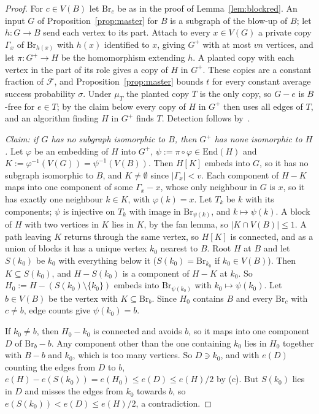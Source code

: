 \documentclass[11pt]{article}
\theoremstyle{remark}
\newcommand{\Fam}{\mathcal{F}}
\newcommand{\abs}[1]{\lvert #1\rvert}
\begin{document}
\begin{proof}
For $c\in V(B)$ let $\mathrm{Br}_c$ be as in the proof of Lemma~\ref{lem:blockred}. An input $G$ of Proposition~\ref{prop:master} for $B$ is a subgraph of the blow-up of $B$; let $h\colon G\to B$ send each vertex to its part. Attach to every $x\in V(G)$ a private copy $\Gamma_x$ of $\mathrm{Br}_{h(x)}$ with $h(x)$ identified to $x$, giving $G^+$ with at most $vn$ vertices, and let $\pi\colon G^+\to H$ be the homomorphism extending $h$. A planted copy with each vertex in the part of its role gives a copy of $H$ in $G^+$. These copies are a constant fraction of $\Fam$, and Proposition~\ref{prop:master} bounds $t$ for every constant average success probability $\sigma$. Under $\mu_T$ the planted copy $T$ is the only copy, so $G-e$ is $B$-free for $e\in T$; by the claim below every copy of $H$ in $G^+$ then uses all edges of $T$, and an algorithm finding $H$ in $G^+$ finds $T$. Detection follows by~\cite[Lemma~23]{CGP26}.

\emph{Claim: if $G$ has no subgraph isomorphic to $B$, then $G^+$ has none isomorphic to $H$.} Let $\varphi$ be an embedding of $H$ into $G^+$, $\psi:=\pi\circ\varphi\in\mathrm{End}(H)$ and $K:=\varphi^{-1}(V(G))=\psi^{-1}(V(B))$. Then $H[K]$ embeds into $G$, so it has no subgraph isomorphic to $B$, and $K\ne\emptyset$ since $\abs{\Gamma_x}<v$. Each component of $H-K$ maps into one component of some $\Gamma_x-x$, whose only neighbour in $G$ is $x$, so it has exactly one neighbour $k\in K$, with $\varphi(k)=x$. Let $T_k$ be $k$ with its components; $\psi$ is injective on $T_k$ with image in $\mathrm{Br}_{\psi(k)}$, and $k\mapsto\psi(k)$. A block of $H$ with two vertices in $K$ lies in $K$, by the fan lemma, so $\abs{K\cap V(B)}\le1$. A path leaving $K$ returns through the same vertex, so $H[K]$ is connected, and as a union of blocks it has a unique vertex $k_0$ nearest to $B$. Root $H$ at $B$ and let $S(k_0)$ be $k_0$ with everything below it ($S(k_0)=\mathrm{Br}_{k_0}$ if $k_0\in V(B)$). Then $K\subseteq S(k_0)$, and $H-S(k_0)$ is a component of $H-K$ at $k_0$. So $H_0:=H-(S(k_0)\setminus\{k_0\})$ embeds into $\mathrm{Br}_{\psi(k_0)}$ with $k_0\mapsto\psi(k_0)$. Let $b\in V(B)$ be the vertex with $K\subseteq\mathrm{Br}_b$. Since $H_0$ contains $B$ and every $\mathrm{Br}_c$ with $c\ne b$, edge counts give $\psi(k_0)=b$.

If $k_0\ne b$, then $H_0-k_0$ is connected and avoids $b$, so it maps into one component $D$ of $\mathrm{Br}_b-b$. Any component other than the one containing $k_0$ lies in $H_0$ together with $B-b$ and $k_0$, which is too many vertices. So $D\ni k_0$, and with $e(D)$ counting the edges from $D$ to $b$, $e(H)-e(S(k_0))=e(H_0)\le e(D)\le e(H)/2$ by (c). But $S(k_0)$ lies in $D$ and misses the edges from $k_0$ towards $b$, so $e(S(k_0))<e(D)\le e(H)/2$, a contradiction.


\end{proof}
\end{document}
